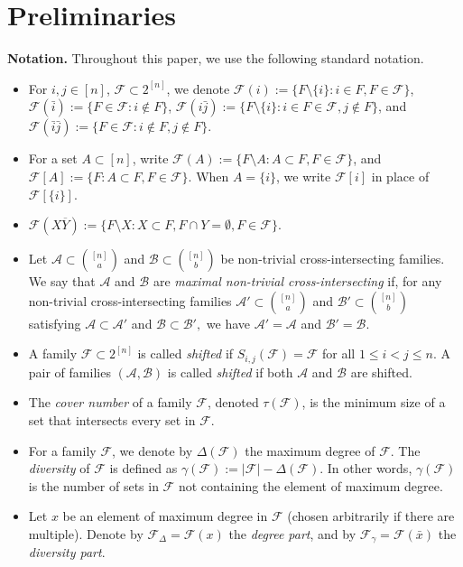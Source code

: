 \documentclass[a4paper,11pt]{article}
\newcommand{\m}{\mathcal}
\begin{document}
\section{Preliminaries}\label{sec:preliminaries}

{\bf Notation.}  Throughout this paper, we use the following standard notation.  
\begin{itemize}
\item For $i,j\in [n]$, $\m F \subset 2^{[n]}$, we denote $\m F(i):=\{F\setminus \{i\}: i\in F, F \in \m F\}$, $\m F(\bar{i}):=\{F\in \m F: i\not\in F \}$, $\m F(i\bar{j}):=\{F\setminus \{i\}: i\in F \in \m F, j\not\in F\}$, and $\m F(\bar{i}\bar{j}):=\{F\in \m F: i\not\in F, j\not\in F \}$. 
\item For a set $A\subset [n]$, write $\m F(A):=\{F\setminus A: A\subset F, F\in \m F\}$, and $\m F[A]:=\{F: A\subset F, F\in \m F\}$. When $A=\{i\}$, we  write $\m F[i]$ in place of $\m F[\{i\}]$.
\item $\m F(X\overline{Y}):=\{F\setminus X: X\subset F, F\cap Y=\emptyset, F\in \m F\}$.
\item Let
$\m A \subset {[n]\choose a}$
and
$\m B \subset {[n]\choose b}$
be non-trivial cross-intersecting families.
We say that
$\m A$ and $\m B$
are {\it maximal non-trivial cross-intersecting}
if, for any non-trivial cross-intersecting families
$\m A' \subset {[n]\choose a}$
and
$\m B' \subset {[n]\choose b}$
satisfying
$\m A \subset \m A'$
and
$\m B \subset \m B',$
we have
$ \m A'=\m A$ and 
$\m B'=\m B.$
\item A family $\mathcal F\subset 2^{[n]}$ is called {\it shifted} if 
$S_{i,j}(\mathcal F)=\mathcal F$ for all $1\le i<j\le n$. 
A pair of families $(\m A, \m B)$ is called {\it shifted} if both $\m A$ and $\m B$ are shifted. 
\item The {\it cover number} of a family $\m F$, denoted $\tau(\m F)$, is the minimum size of a set that intersects every set in $\m F$. 
\item For a family $\mathcal{F}$, we denote by $\Delta(\mathcal{F})$ the maximum degree of $\mathcal{F}$. The {\it diversity} of $\m F$ is defined as $\gamma(\m F) := |\m F|-\Delta(\m F).$
In other words, $\gamma (\m F)$ is the number of sets in $\m F$ not containing the element of maximum degree.
\item Let $x$ be an element of maximum degree in $\mathcal{F}$  (chosen arbitrarily if there are multiple). Denote by $\mathcal{F}_\Delta = \mathcal{F}(x)$ the {\it degree part}, and by $\mathcal{F}_\gamma = \mathcal{F}(\bar x)$ the {\it diversity part}.   

\end{itemize}
\end{document}
